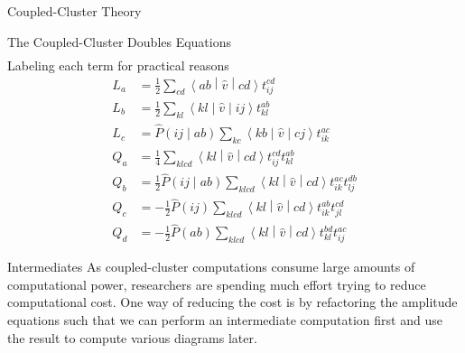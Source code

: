 \documentclass[twoside,english]{uiofysmaster}
\begin{document}
\begin{chapter}{Coupled-Cluster Theory}
\begin{section}{The Coupled-Cluster Doubles Equations}
\begin{align}
  		\end{align}
  		Labeling each term for practical reasons	
  		\begin{align}
  			L_a &= \frac{1}{2} \sum_{cd}\left<ab\middle|\hat v\middle|cd\right>t_{ij}^{cd} \\
  			L_b &= \frac{1}{2} \sum_{kl} \left<kl\middle|\hat v\middle|ij\right>t_{kl}^{ab} \\
  			L_c &= \hat P\left(ij\middle|ab\right) \sum_{kc}\left<kb\middle|\hat v\middle|cj\right>t_{ik}^{ac} \\
  			Q_a &= \frac{1}{4} \sum_{klcd}\left<kl\middle|\hat v\middle|cd\right>t_{ij}^{cd} t_{kl}^{ab} \\
  			Q_b &= \frac{1}{2} \hat P\left(ij\middle|ab\right) \sum_{klcd}\left<kl\middle|\hat v\middle|cd\right>t_{ik}^{ac} t_{lj}^{db} \\
  			Q_c &= - \frac{1}{2}\hat P(ij) \sum_{klcd}\left<kl\middle|\hat v\middle|cd\right>t_{ik}^{ab} t_{jl}^{cd} \\
  			Q_d &= - \frac{1}{2}\hat P(ab) \sum_{klcd}\left<kl\middle|\hat v\middle|cd\right>t_{kl}^{bd} t_{ij}^{ac}
  		\end{align}
   	\end{section}
   	\newpage
  	\begin{section}{Intermediates}
  		As coupled-cluster computations consume large amounts of computational power, researchers are spending much effort trying to reduce computational cost. One way of reducing the cost is by refactoring the amplitude equations such that we can perform an intermediate computation first and use the result to compute various diagrams later. 


\end{section}
\end{chapter}
\end{document}
